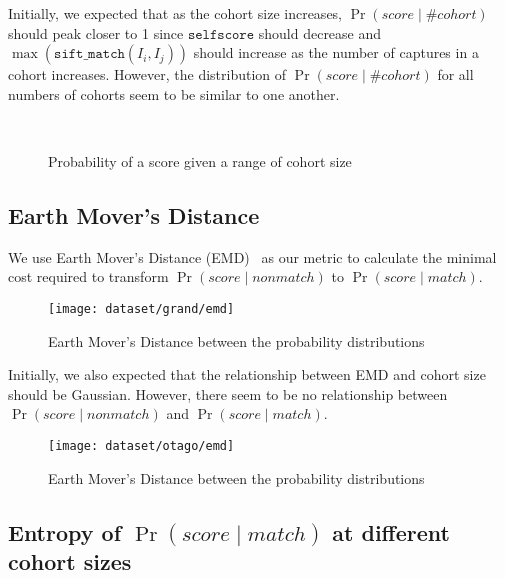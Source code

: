 Initially, we expected that as the cohort size increases, $\Pr{(score \mid
\#cohort)}$ should peak closer to 1 since $\texttt{selfscore}$ should decrease
and $\max{(\texttt{sift\_match}(I_i, I_j))}$ should increase as the number of
captures in a cohort increases. However, the distribution of $\Pr{(score \mid
\#cohort)}$ for all numbers of cohorts seem to be similar to one another.

\begin{figure}[htbp]
  \centering
  \label{fig:otago_pscohort}\\ %
  \caption{Probability of a score given a range of cohort size}
  \label{fig:otago_psnoncohort} %
\end{figure}

\FloatBarrier%
\subsection{Earth Mover's Distance}

We use Earth Mover's Distance (EMD)~\cite{emd00} as our metric to calculate the
minimal cost required to transform $\Pr{(score \mid nonmatch)}$ to $\Pr{(score \mid match)}$.

\begin{figure}[htbp]
  \centering
  \texttt{[image: dataset/grand/emd]}
  \caption{Earth Mover's Distance between the probability distributions}
  \label{fig:grand_emd} %
\end{figure}

Initially, we also expected that the relationship between EMD and cohort size
should be Gaussian. However, there seem to be no relationship between
$\Pr{(score \mid nonmatch)}$ and $\Pr{(score \mid match)}$.

\begin{figure}[htbp]
  \centering
  \texttt{[image: dataset/otago/emd]}
  \caption{Earth Mover's Distance between the probability distributions}
  \label{fig:otago_emd} %
\end{figure}

\subsection{Entropy of $\Pr{(score \mid match)}$ at different cohort sizes}

